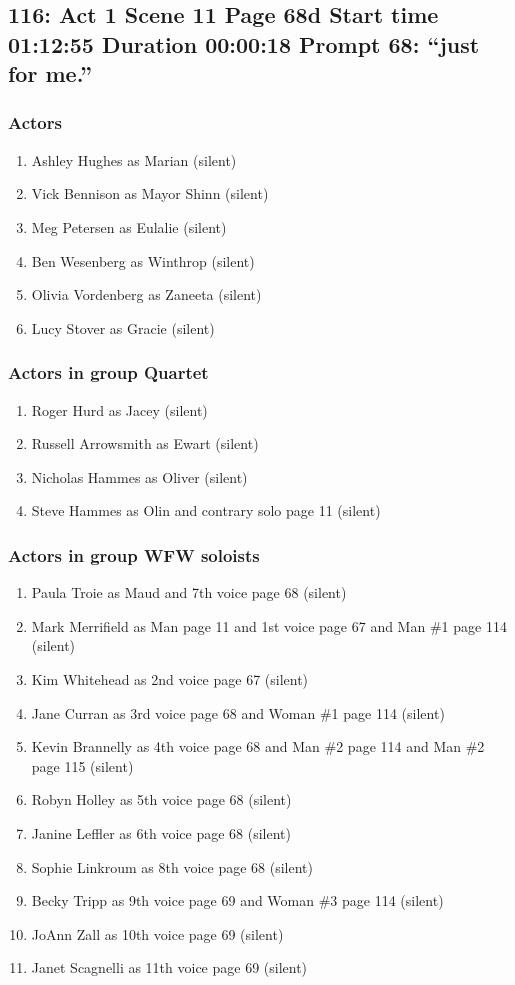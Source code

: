 \subsection{116: Act 1 Scene 11 Page 68d Start time 01:12:55 Duration 00:00:18 Prompt 68: ``just for me.''}

\subsubsection{Actors}
\begin{enumerate}
\item Ashley Hughes as Marian (silent)
\item Vick Bennison as Mayor Shinn (silent)
\item Meg Petersen as Eulalie (silent)
\item Ben Wesenberg as Winthrop (silent)
\item Olivia Vordenberg as Zaneeta (silent)
\item Lucy Stover as Gracie (silent)
\end{enumerate}
\subsubsection{Actors in group Quartet}
\begin{enumerate}
\item Roger Hurd as Jacey (silent)
\item Russell Arrowsmith as Ewart (silent)
\item Nicholas Hammes as Oliver (silent)
\item Steve Hammes as Olin and contrary solo page 11 (silent)
\end{enumerate}
\subsubsection{Actors in group WFW soloists}
\begin{enumerate}
\item Paula Troie as Maud and 7th voice page 68 (silent)
\item Mark Merrifield as Man page 11 and 1st voice page 67 and Man \#1 page 114 (silent)
\item Kim Whitehead as 2nd voice page 67 (silent)
\item Jane Curran as 3rd voice page 68 and Woman \#1 page 114 (silent)
\item Kevin Brannelly as 4th voice page 68 and Man \#2 page 114 and Man \#2 page 115 (silent)
\item Robyn Holley as 5th voice page 68 (silent)
\item Janine Leffler as 6th voice page 68 (silent)
\item Sophie Linkroum as 8th voice page 68 (silent)
\item Becky Tripp as 9th voice page 69 and Woman \#3 page 114 (silent)
\item JoAnn Zall as 10th voice page 69 (silent)
\item Janet Scagnelli as 11th voice page 69 (silent)
\end{enumerate}

